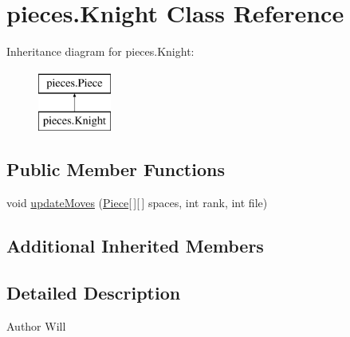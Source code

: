 \hypertarget{classpieces_1_1_knight}{\section{pieces.\-Knight Class Reference}
\label{classpieces_1_1_knight}
}
Inheritance diagram for pieces.\-Knight\-:\begin{figure}[H]
\begin{center}
\leavevmode
\includegraphics[height=2.000000cm]{classpieces_1_1_knight}
\end{center}
\end{figure}
\subsection*{Public Member Functions}
\begin{DoxyCompactItemize}
\item 
void \hyperlink{classpieces_1_1_knight_a6d689702e1d14b61804c2c00b2124bc9}{update\-Moves} (\hyperlink{classpieces_1_1_piece}{Piece}\mbox{[}$\,$\mbox{]}\mbox{[}$\,$\mbox{]} spaces, int rank, int file)
\end{DoxyCompactItemize}
\subsection*{Additional Inherited Members}


\subsection{Detailed Description}
\begin{DoxyAuthor}{Author}
Will 
\end{DoxyAuthor}


